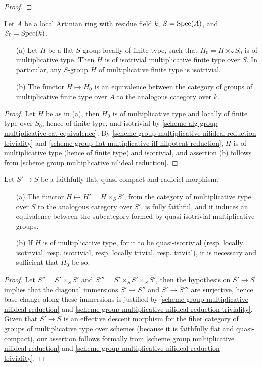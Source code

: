 \begin{proof}
\end{proof}

\begin{corollary}\label{scheme group multiplicative over local Artin closed reduction}
Let $A$ be a local Artinian ring with residue field $k$, $S=\mathrm{Spec}(A)$, and $S_0=\mathrm{Spec}(k)$.
\begin{enumerate}
    \item[(a)] Let $H$ be a flat $S$-group locally of finite type, such that $H_0=H\times_SS_0$ is of multiplicative type. Then $H$ is of isotrivial multiplicative finite type over $S$. In particular, any $S$-group $H$ of multiplicative finite type is isotrivial.
    \item[(b)] The functor $H\mapsto H_0$ is an equivalence between the category of groups of multiplicative finite type over $A$ to the analogous category over $k$.
\end{enumerate}
\end{corollary}
\begin{proof}
Let $H$ be as in (a), then $H_0$ is of multiplicative type and locally of finite type over $S_0$, hence of finite type, and isotrivial by \cref{scheme alg group multiplicative cat equivalence}. By \cref{scheme group multiplicative nilideal reduction triviality} and \cref{scheme group flat multiplicative iff nilpotent reduction}, $H$ is of multiplicative type (hence of finite type) and isotrivial, and assertion (b) follows from \cref{scheme group multiplicative nilideal reduction}.
\end{proof}

\begin{corollary}\label{scheme group multiplicative fpqc radiciel base change}
Let $S'\to S$ be a faithfully flat, quasi-compact and radiciel morphism.
\begin{enumerate}
    \item[(a)] The functor $H\mapsto H'=H\times_SS'$, from the category of multiplicative type over $S$ to the analogous category over $S'$, is fully faithful, and it induces an equivalence between the subcategory formed by quasi-isotrivial multiplicative groups.
    \item[(b)] If $H$ is of multiplicative type, for it to be quasi-isotrivial (resp. locally isotrivial, resp. isotrivial, resp. locally trivial, resp. trivial), it is necessary and sufficient that $H_0$ be so.
\end{enumerate}
\end{corollary}
\begin{proof}
Let $S''=S'\times_SS'$ and $S'''=S'\times_SS'\times_SS'$, then the hypothesis on $S'\to S$ implies that the diagonal immersions $S'\to S''$ and $S'\to S'''$ are surjective, hence base change along these immersions is justified by \cref{scheme group multiplicative nilideal reduction} and \cref{scheme group multiplicative nilideal reduction triviality}. Given that $S'\to S$ is an effective descent morphism for the fiber category of groups of multiplicative type over schemes (because it is faithfully flat and quasi-compact), our assertion follows formally from \cref{scheme group multiplicative nilideal reduction} and \cref{scheme group multiplicative nilideal reduction triviality}.
\end{proof}

